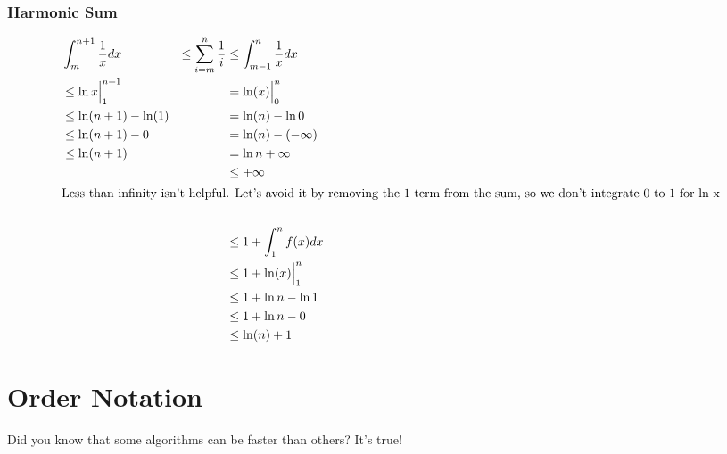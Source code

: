 \documentclass[english, 10pt]{article}
\begin{document}
\subsubsection{Harmonic Sum}
\begin{align*}
    &\int_{m}^{n+1} \frac{1}{x} dx &\le \sum_{i=m}^{n} \frac{1}{i} &\le \int_{m-1}^{n} \frac{1}{x} dx \\
    &\le \ln x \Big|_1^{n+1} &&= \ln(x) \Big|_0^n \\
    &\le \ln (n+1) -\ln(1) &&= \ln(n) -\ln 0 \\
    &\le \ln (n+1) - 0 &&= \ln(n) - (-\infty) \\
    &\le \ln (n+1)  &&= \ln n +\infty \\
    &&&\le +\infty\\
    \intertext{Less than infinity isn't helpful. Let's avoid it by removing the 1 term from the sum, so we don't integrate 0 to 1 for ln x} \\
    &&&\le 1+ \int_{1}^{n} f(x) dx \\
    &&&\le 1+ \ln(x) \Big|_1^n \\
    &&&\le 1+ \ln n - \ln 1 \\
    &&&\le 1+ \ln n -0 \\
    &&&\le \ln(n) + 1 \\
\end{align*}


\section{Order Notation}
Did you know that some algorithms can be faster than others? It's true!
\end{document}
